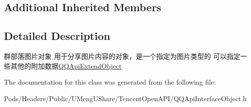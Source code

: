 \subsection*{Additional Inherited Members}


\subsection{Detailed Description}
群部落图片对象 用于分享图片内容的对象，是一个指定为图片类型的 可以指定一些其他的附加数据{\ttfamily \mbox{\hyperlink{interface_q_q_api_extend_object}{Q\+Q\+Api\+Extend\+Object}}} 

The documentation for this class was generated from the following file\+:\begin{DoxyCompactItemize}
\item 
Pods/\+Headers/\+Public/\+U\+Meng\+U\+Share/\+Tencent\+Open\+A\+P\+I/Q\+Q\+Api\+Interface\+Object.\+h\end{DoxyCompactItemize}

